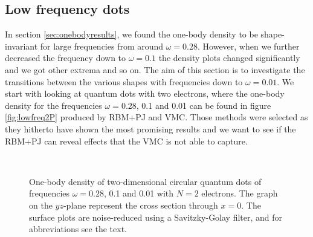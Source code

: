 \newpage
\subsection{Low frequency dots} \label{sec:lowfrequencies}
In section \ref{sec:onebodyresults}, we found the one-body density to be shape-invariant for large frequencies from around $\omega=0.28$. However, when we further decreased the frequency down to $\omega=0.1$ the density plots changed significantly and we got other extrema and so on. The aim of this section is to investigate the transitions between the various shapes with frequencies down to $\omega=0.01$. We start with looking at quantum dots with two electrons, where the one-body density for the frequencies $\omega=0.28$, 0.1 and 0.01 can be found in figure \eqref{fig:lowfreq2P} produced by RBM+PJ and VMC. Those methods were selected as they hitherto have shown the most promising results and we want to see if the RBM+PJ can reveal effects that the VMC is not able to capture.

\begin{figure}
	\centering
	\captionsetup[subfigure]{labelformat=empty}
	\hspace{0.1cm}
	\hspace{-0.cm}
	\hspace{-0.cm}
	\\ [-0.cm]
	
	\hspace{0.1cm}
	\hspace{-0.cm}
	\hspace{-0.cm}
	
	\caption{One-body density of two-dimensional circular quantum dots of frequencies $\omega=0.28$, 0.1 and 0.01 with $N=2$ electrons. The graph on the $yz$-plane represent the cross section through $x=0$. The surface plots are noise-reduced using a Savitzky-Golay filter, and for abbreviations see the text.}
	\label{fig:lowfreq2P}
\end{figure}


